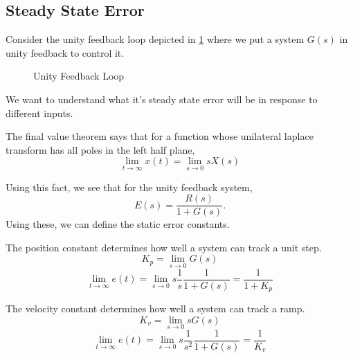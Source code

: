 \subsection{Steady State Error}
Consider the unity feedback loop depicted in \cref{fig:unity-feedback-loop} where we put a system $G(s)$ in unity feedback to control it.
\begin{figure}[H]
    \centering 
    \caption{Unity Feedback Loop}
    \label{fig:unity-feedback-loop}
\end{figure}
We want to understand what it's steady state error will be in response to different inputs.
\begin{theorem}
  The final value theorem says that for a function whose unilateral laplace transform has all poles in the left half plane,
  \[
	\lim_{t\to\infty}x(t) = \lim_{s\to0} sX(s)
  \]
  \label{thm:final-value-theorem}
\end{theorem}
Using this fact, we see that for the unity feedback system,
\[
  E(s) = \frac{R(s)}{1+G(s)}.
\]
Using these, we can define the static error constants.
\begin{definition}
  The position constant determines how well a system can track a unit step.
  \begin{equation}
	K_p = \lim_{s\to0}G(s)
	\label{eqn:position-constant}
  \end{equation}
  \[
	\lim_{t\to\infty} e(t) = \lim_{s\to0} s \frac{1}{s} \frac{1}{1+G(s)} = \frac{1}{1+K_p}
  \]
  \label{defn:position-constant}
\end{definition}
\begin{definition}
  The velocity constant determines how well a system can track a ramp.
  \begin{equation}
	K_v = \lim_{s\to0}sG(s)
	\label{eqn:velocity-constant}
  \end{equation}
  \[
	\lim_{t\to\infty} e(t) = \lim_{s\to0} s \frac{1}{s^2} \frac{1}{1+G(s)} = \frac{1}{K_v}
  \]
  \label{defn:velocity-constant}
\end{definition}
